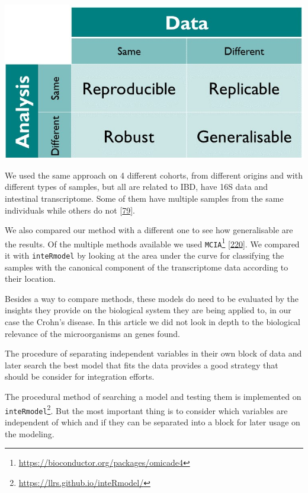 \documentclass[
  a4paper,
]{book}
\DeclareRobustCommand{\href}[2]{#2\footnote{\url{#1}}}
\let\origfigure\figure
\let\endorigfigure\endfigure
\renewenvironment{figure}[1][2] {
    \expandafter\origfigure\expandafter[!ht]
} {
    \endorigfigure
}
\begin{document}
\begin{figure}
\includegraphics[width=1\linewidth]{images/turing_way_reproducible-matrix} \caption[Reproducibility matrix]{Reproducibility matrix indicating the terminology used between using the same method and the same data. Figure from The Turing Way: A Handbook for Reproducible Data Science (Version v1.0.1).}\label{fig:reproducible-matrix}
\end{figure}

We used the same approach on 4 different cohorts, from different origins and with different types of samples, but all are related to IBD, have 16S data and intestinal transcriptome.
Some of them have multiple samples from the same individuals while others do not {[}\protect\hyperlink{ref-hasler_uncoupling_2016}{79}{]}.

We also compared our method with a different one to see how generalisable are the results.
Of the multiple methods available we used \href{https://bioconductor.org/packages/omicade4}{\texttt{MCIA}} {[}\protect\hyperlink{ref-mengMultivariateApproachIntegration2014}{220}{]}.
We compared it with \texttt{inteRmodel} by looking at the area under the curve for classifying the samples with the canonical component of the transcriptome data according to their location.

Besides a way to compare methods, these models do need to be evaluated by the insights they provide on the biological system they are being applied to, in our case the Crohn's disease.
In this article we did not look in depth to the biological relevance of the microorganisms an genes found.

The procedure of separating independent variables in their own block of data and later search the best model that fits the data provides a good strategy that should be consider for integration efforts.

The procedural method of searching a model and testing them is implemented on \href{https://llrs.github.io/inteRmodel/}{\texttt{inteRmodel}}.
But the most important thing is to consider which variables are independent of which and if they can be separated into a block for later usage on the modeling.
\end{document}
